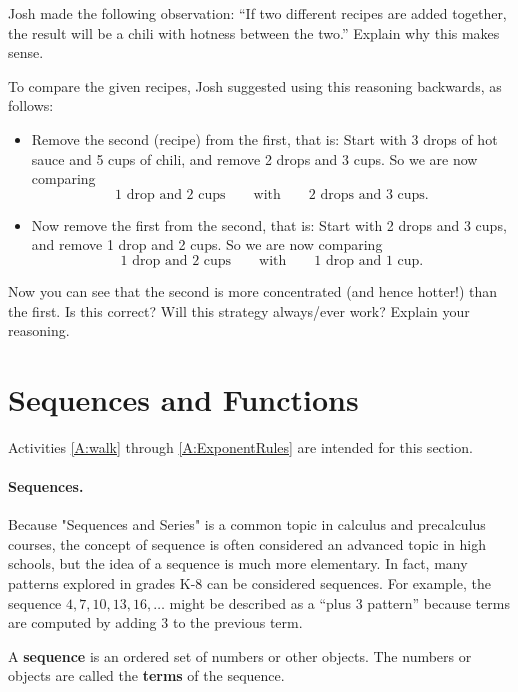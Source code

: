 \begin{problems}
\begin{enumerate}
Josh made the following observation:  ``If two different recipes are added 
together, the result will be a chili with hotness between the two.''  Explain
why this makes sense.  

To compare the given recipes, Josh suggested using this reasoning backwards, 
as follows:  
 
\begin{itemize}
\item Remove the second (recipe) from the first, that is: Start with 3
  drops of hot sauce and 5 cups of chili, and remove 2 drops and 3
  cups. So we are now comparing
\[
\text{1 drop and 2 cups}\qquad\text{with}\qquad\text{2 drops and 3 cups.}
\]
\item Now remove the first from the second, that is: Start with 2
  drops and 3 cups, and remove 1 drop and 2 cups. So we are now
  comparing
\[
\text{1 drop and 2 cups}\qquad\text{with}\qquad\text{1 drop and 1
  cup.}
\]
\end{itemize}
Now you can see that the second is more concentrated (and hence
hotter!) than the first. Is this correct? Will this strategy
always/ever work? Explain your reasoning.
\end{enumerate}
\end{problems}

\section{Sequences and Functions}

\begin{activitynote}
Activities \ref{A:walk} through \ref{A:ExponentRules} are intended for this section.  
\end{activitynote}

\paragraph{Sequences.}  Because "Sequences and Series" is a common topic in calculus and precalculus courses, the concept of sequence is often considered an advanced topic in high schools, but the idea of a sequence is much more elementary.  In fact, many patterns explored in grades K-8 can be considered sequences.  For example, the sequence $4, 7, 10, 13, 16, \dots$ might be described as a ``plus 3 pattern'' because terms are computed by adding 3 to the previous term.  
\begin{definition}
A \textbf{sequence} is an ordered set of numbers or other objects.  The numbers or objects are called the \textbf{terms} of the sequence.  
\end{definition}

